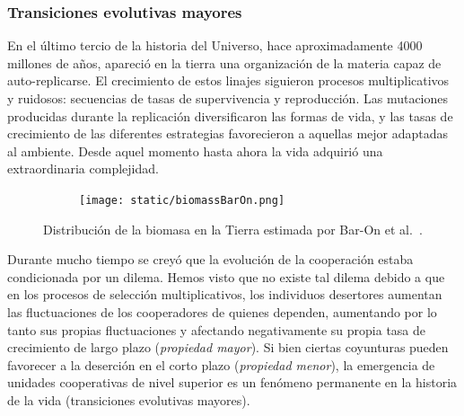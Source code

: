 \documentclass[a4paper,11pt]{book}
\theoremstyle{definition}
\begin{document}
\subsubsection{Transiciones evolutivas mayores}

En el \'ultimo tercio de la historia del Universo, hace aproximadamente 4000 millones de a\~nos, apareci\'o en la tierra una organizaci\'on de la materia capaz de auto-replicarse.
%
El crecimiento de estos linajes siguieron procesos multiplicativos y ruidosos: secuencias de tasas de supervivencia y reproducci\'on.
%
Las mutaciones producidas durante la replicaci\'on diversificaron las formas de vida, y las tasas de crecimiento de las diferentes estrategias favorecieron a aquellas mejor adaptadas al ambiente.
%
Desde aquel momento hasta ahora la vida adquiri\'o una extraordinaria complejidad.

%

\begin{figure}[ht!]
    \centering
    \begin{subfigure}[b]{0.65\textwidth}
    \texttt{[image: static/biomassBarOn.png]}
    \end{subfigure}
    \caption{
	Distribuci\'on de la biomasa en la Tierra estimada por Bar-On et al.~\cite{barOn2018-biomass}.
    }
    \label{fig:biomass}
\end{figure}


Durante mucho tiempo se crey\'o que la evoluci\'on de la cooperaci\'on estaba condicionada por un dilema.
%
Hemos visto que no existe tal dilema debido a que en los procesos de selecci\'on multiplicativos, los individuos desertores aumentan las fluctuaciones de los cooperadores de quienes dependen, aumentando por lo tanto sus propias fluctuaciones y afectando negativamente su propia tasa de crecimiento de largo plazo (\emph{propiedad mayor}).
%
Si bien ciertas coyunturas pueden favorecer a la deserci\'on en el corto plazo (\emph{propiedad menor}), la emergencia de unidades cooperativas de nivel superior es un fen\'omeno permanente en la historia de la vida (transiciones evolutivas mayores).

\end{document}
